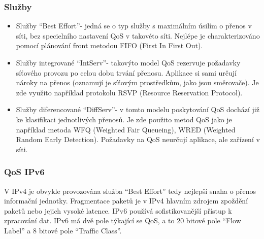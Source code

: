 \subsubsection{Služby}
\begin{itemize}
    \item Služby \enquote{Best Effort}- jedná se o typ služby s maximálním úsilím o přenos v síti, bez specielního nastavení QoS v takovéto síti. Nejlépe je charakterizováno pomocí plánování front metodou FIFO (First In First Out).
    \item Služby integrované \enquote{IntServ}- takovýto model QoS rezervuje požadavky síťového provozu po celou dobu trvání přenosu. Aplikace si sami určují nároky na přenos (oznamují je síťovým prostředkům, jako jsou směrovače). Je zde využito například protokolu RSVP (Resource Reservation Protocol).
    \item Služby diferencované \enquote{DiffServ}- v tomto modelu poskytování QoS dochází již ke klasifikaci jednotlivých přenosů. Je zde použito metod QoS jako je například metoda WFQ (Weighted Fair Queueing), WRED (Weighted Random Early Detection). Požadavky na QoS neurčují aplikace, ale zařízení v síti.
\end{itemize}

\subsubsection{QoS IPv6}
V IPv4 je obvykle provozována služba \enquote{Best Effort} tedy nejlepší snaha o přenos informační jednotky. Fragmentace paketů je v IPv4 hlavním zdrojem zpoždění paketů nebo jejich vysoké latence. IPv6 používá sofistikovanější přístup k zpracování dat. IPv6 má dvě pole týkající se QoS, a to 20 bitové pole \enquote{Flow Label} a 8 bitové pole \enquote{Traffic Class}.


